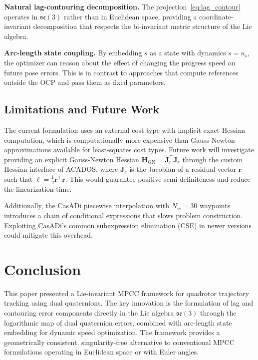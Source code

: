 \documentclass[journal]{IEEEtran}
\newcommand{\se}{\mathfrak{se}(3)}        %
\begin{document}
\textbf{Natural lag-contouring decomposition.} The projection~\eqref{eq:lag_contour} operates in $\se$ rather than in Euclidean space, providing a coordinate-invariant decomposition that respects the bi-invariant metric structure of the Lie algebra.

\textbf{Arc-length state coupling.} By embedding $s$ as a state with dynamics $\dot{s} = u_s$, the optimizer can reason about the effect of changing the progress speed on future pose errors. This is in contrast to approaches that compute references outside the OCP and pass them as fixed parameters.

\subsection{Limitations and Future Work}

The current formulation uses an external cost type with implicit exact Hessian computation, which is computationally more expensive than Gauss-Newton approximations available for least-squares cost types. Future work will investigate providing an explicit Gauss-Newton Hessian $\bm{H}_{\text{GN}} = \bm{J}_r^\top \bm{J}_r$ through the custom Hessian interface of ACADOS, where $\bm{J}_r$ is the Jacobian of a residual vector $\bm{r}$ such that $\ell = \frac{1}{2}\bm{r}^\top\bm{r}$. This would guarantee positive semi-definiteness and reduce the linearization time.

Additionally, the CasADi piecewise interpolation with $N_w = 30$ waypoints introduces a chain of conditional expressions that slows problem construction. Exploiting CasADi's common subexpression elimination (CSE) in newer versions could mitigate this overhead.

\section{Conclusion}

This paper presented a Lie-invariant MPCC framework for quadrotor trajectory tracking using dual quaternions. The key innovation is the formulation of lag and contouring error components directly in the Lie algebra $\se$ through the logarithmic map of dual quaternion errors, combined with arc-length state embedding for dynamic speed optimization. The framework provides a geometrically consistent, singularity-free alternative to conventional MPCC formulations operating in Euclidean space or with Euler angles.
\end{document}
